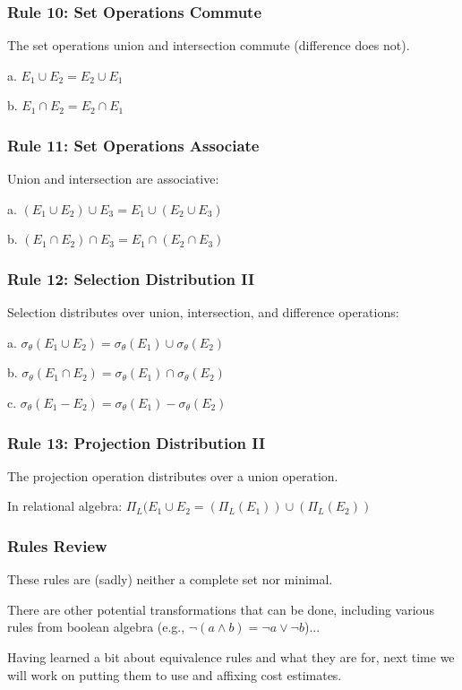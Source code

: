 \begin{frame}
\frametitle{Rule 10: Set Operations Commute}

The set operations union and intersection commute  (difference does not).

a. $E_{1} \cup E_{2} = E_{2} \cup E_{1}$

b. $E_{1} \cap E_{2} = E_{2} \cap E_{1}$


\end{frame}

\begin{frame}
\frametitle{Rule 11: Set Operations Associate}

Union and intersection are associative:

a. $(E_{1} \cup E_{2}) \cup E_{3} = E_{1} \cup (E_{2} \cup E_{3})$

b. $(E_{1} \cap E_{2}) \cap E_{3} = E_{1} \cap (E_{2} \cap E_{3})$

\end{frame}

\begin{frame}
\frametitle{Rule 12: Selection Distribution II}

Selection distributes over union, intersection, and difference operations:

a. $\sigma_{\theta}(E_{1} \cup E_{2}) = \sigma_{\theta}(E_{1}) \cup \sigma_{\theta}(E_{2})$

b. $\sigma_{\theta}(E_{1} \cap E_{2}) = \sigma_{\theta}(E_{1}) \cap \sigma_{\theta}(E_{2})$

c. $\sigma_{\theta}(E_{1} - E_{2}) = \sigma_{\theta}(E_{1}) - \sigma_{\theta}(E_{2})$



\end{frame}

\begin{frame}
\frametitle{Rule 13: Projection Distribution II }

The projection operation distributes over a union operation.

In relational algebra: $\Pi_{L}(E_{1} \cup E_{2} = (\Pi_{L}(E_{1}))\cup(\Pi_{L}(E_{2}))$



\end{frame}


\begin{frame}
\frametitle{Rules Review}


These rules are (sadly) neither a complete set nor minimal. 

There are other potential transformations that can be done, including various rules from boolean algebra (e.g., $\neg (a \wedge b) = \neg a \vee \neg b$)...

Having learned a bit about equivalence rules and what they are for, next time we will work on putting them to use and affixing cost estimates.

\end{frame}








